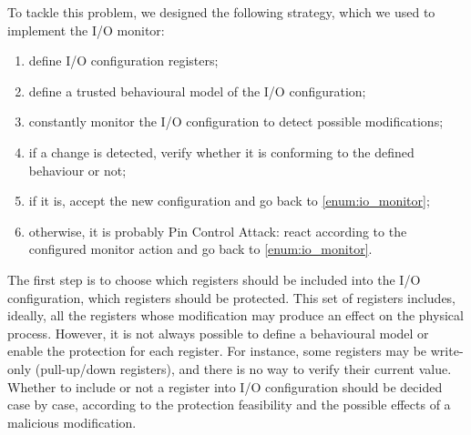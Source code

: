 To tackle this problem, we designed the following strategy, which we used to implement the I/O monitor:
\begin{enumerate}
	\item define I/O configuration registers;
	\item define a trusted behavioural model of the I/O configuration;
	\item \label{enum:io_monitor} constantly monitor the I/O configuration to detect possible modifications;
	\item if a change is detected, verify whether it is conforming to the defined behaviour or not;
	\item if it is, accept the new configuration and go back to \ref{enum:io_monitor};
	\item otherwise, it is probably Pin Control Attack: react according to the configured monitor action and go back to \ref{enum:io_monitor}.
\end{enumerate}
The first step is to choose which registers should be included into the I/O configuration, \ie which registers should be protected.
This set of registers includes, ideally, all the registers whose modification may produce an effect on the physical process.
However, it is not always possible to define a behavioural model or enable the protection for each register. For instance,
some registers may be write-only (\eg pull-up/down registers), and there is no way to verify their current value.
Whether to include or not a register into I/O configuration should be decided case by case,
according to the protection feasibility and the possible effects of a malicious modification.

